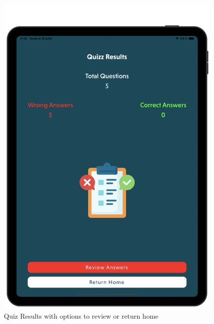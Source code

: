 \begin{figure}[H]
    \centering
    \begin{minipage}[b]{0.43\linewidth}
        \centering
        \includegraphics[width=\linewidth]{TabletUI/Quiz Results with options to review or return home.png}
        \caption{Quiz Results with options to review or return home}
    \end{minipage}
    \hspace{0.1\linewidth}
    \begin{minipage}[b]{0.43\linewidth}
        \centering

\end{minipage}
\end{figure}
